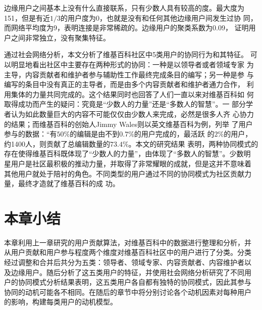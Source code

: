 边缘用户之间基本上没有什么直接联系，只有少数人具有较高的度。最大度为
151，但是有近$1/3$的用户度为0，也就是没有和任何其他边缘用户间发生过协
同，而网络平均度为9，表明连接是非常稀疏的。边缘用户的聚类系数为0.09，
证明用户之间非常独立，没有聚集特征。

通过社会网络分析，本文分析了维基百科社区中5类用户的协同行为和其特征。
可以明显地看出社区中主要存在两种形式的协同：一种是以领导者或者领域专家
为主导，内容贡献者和维护者参与辅助性工作最终完成条目的编写；另一种是参
与编写的条目中没有真正的主导者，而是由多个内容贡献者和维护者通力合作，
利用集体的力量共同完成的。这个结果同时也回答了人们一直以来对维基百科如
何取得成功而产生的疑问：究竟是“少数人的力量”还是“多数人的智慧”。一
部分学者认为如此数量巨大的内容不可能仅仅由少数人来完成，必然是很多人齐
心协力的结果；而维基百科的创始人Jimmy Wales则以英文维基百科为例，列举
了用户参与的数据：“有$50\%$的编辑是由不到$0.7\%$的用户完成的，最活跃
的$2\%$的用户，约1400人，则贡献了总编辑数量的$73.4\%$。本文的研究结果
表明，两种协同模式的
存在使得维基百科既体现了“少数人的力量”，由体现了“多数人的智慧”。少数明
星用户是社区最积极的推动力量，并取得了非常耀眼的成就，但是这并不意味着
其他用户就处于陪衬的角色。不同类型的用户通过不同的协同模式为社区贡献力量，最终才造就了维基百科的成
功。

\section{本章小结}
\label{sec:conclusion}

本章利用上一章研究的用户贡献算法，对维基百科中的数据进行整理和分析，并
从用户贡献和用户参与程度两个维度对维基百科社区中的用户进行了分类。分类
经过调整和合并后共分为五类：领导者、领域专家、内容贡献者、内容维护者以
及边缘用户。随后分析了这五类用户的特征，并使用社会网络分析研究了不同用
户的协同模式分析结果表明，这五类用户各自都有独特的协同模式，因此其参与
协同的动机可能各不相同。在随后的章节中将分别讨论各个动机因素对每种用户
的影响，构建每类用户的动机模型。
